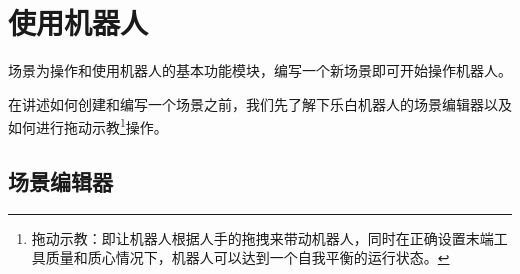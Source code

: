 \chapter{使用机器人}

场景为操作和使用机器人的基本功能模块，编写一个新场景即可开始操作机器人。

在讲述如何创建和编写一个场景之前，我们先了解下乐白机器人的场景编辑器以及如何进行拖动示教\footnote{拖动示教：即让机器人根据人手的拖拽来带动机器人，同时在正确设置末端工具质量和质心情况下，机器人可以达到一个自我平衡的运行状态。}操作。

\vspace*{-0.8em}

\section{场景编辑器}\vspace*{-0.2em}
